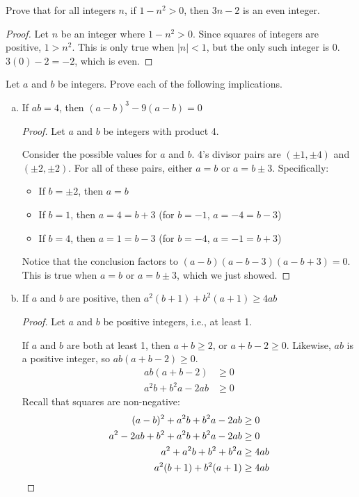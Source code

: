 \question Prove that for all integers $n$, if $1-n^2 > 0$, then $3n - 2$ is an even integer.
\begin{proof}
  Let $n$ be an integer where $1-n^2 > 0$.
  Since squares of integers are positive, $1 > n^2$.
  This is only true when $|n| < 1$, but the only such integer is 0.
  $3(0)-2=-2$, which is even.
\end{proof}


\question Let $a$ and $b$ be integers. Prove each of the following implications.
\begin{enumerate}[(a)]
  \item If $ab = 4$, then $(a-b)^3 - 9(a-b) = 0$
        \begin{proof}
          Let $a$ and $b$ be integers with product 4.

          Consider the possible values for $a$ and $b$.
          4's divisor pairs are $(\pm 1, \pm 4)$ and $(\pm 2, \pm 2)$.
          For all of these pairs, either $a=b$ or $a=b\pm3$.
          Specifically:
          \begin{itemize}
            \item If $b=\pm2$, then $a=b$
            \item If $b=1$, then $a=4=b+3$ (for $b=-1$, $a=-4=b-3$)
            \item If $b=4$, then $a=1=b-3$ (for $b=-4$, $a=-1=b+3$)
          \end{itemize}

          Notice that the conclusion factors to $(a-b)(a-b-3)(a-b+3)=0$.
          This is true when $a=b$ or $a=b\pm3$, which we just showed.
        \end{proof}
  \item If $a$ and $b$ are positive, then $a^2(b+1) + b^2(a+1) \geq 4ab$
        \begin{proof}
          Let $a$ and $b$ be positive integers, i.e., at least 1.

          If $a$ and $b$ are both at least 1, then $a+b \geq 2$, or $a+b-2 \geq 0$.
          Likewise, $ab$ is a positive integer, so $ab(a+b-2) \geq 0$.
          \begin{align*}
            ab(a+b-2)         & \geq 0 \\
            a^2b + b^2a - 2ab & \geq 0
          \end{align*}
          Recall that squares are non-negative:
          \begin{align*}
            (a-b)^2 + a^2b + b^2a - 2ab         & \geq 0            \\
            a^2 - 2ab + b^2 + a^2b + b^2a - 2ab & \geq 0            \\
            a^2 + a^2b + b^2 + b^2a             & \geq 4ab          \\
            a^2(b+1) + b^2(a+1)                 & \geq 4ab \qedhere
          \end{align*}
        \end{proof}
\end{enumerate}


